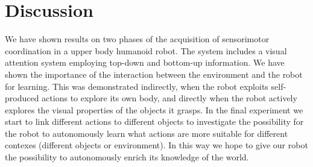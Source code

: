 \section{Discussion}
We have shown results on two phases of the acquisition of sensorimotor coordination in a upper body humanoid robot. The system includes a visual attention system employing top-down and bottom-up information. We have shown the importance of the interaction between the environment and the robot for learning. This was demonstrated indirectly, when the robot exploits self-produced actions to explore its own body, and directly when the robot actively explores the visual properties of the objects it grasps. In the final experiment we start to link different actions to different objects to investigate the possibility for the robot to autonomously learn what actions are more suitable for different contexes (different objects or environment). In this way we hope to give our robot the possibility to autonomously enrich its knowledge of the world. 